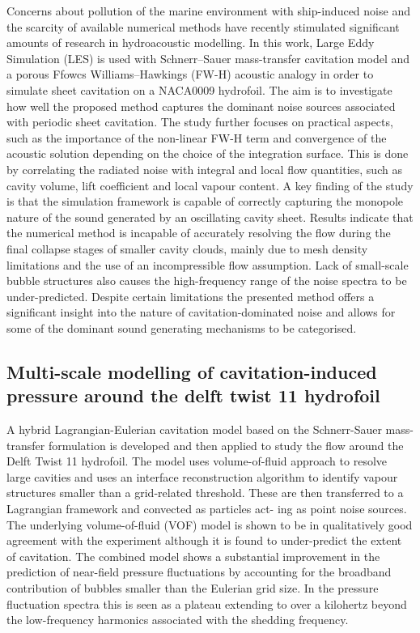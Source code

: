 \documentclass[a4paper,10pt]{article}
\begin{document}
	Concerns about pollution of the marine environment with ship-induced noise and the scarcity of available numerical methods have recently stimulated significant amounts of research in hydroacoustic modelling. In this work, Large Eddy Simulation (LES) is used with Schnerr–Sauer mass-transfer cavitation model and a porous Ffowcs Williams–Hawkings (FW-H) acoustic analogy in order to simulate sheet cavitation on a NACA0009 hydrofoil. The aim is to investigate how well the proposed method captures the dominant noise sources associated with periodic sheet cavitation. The study further focuses on practical aspects, such as the importance of the non-linear FW-H term and convergence of the acoustic solution depending on the choice of the integration surface. This is done by correlating the radiated noise with integral and local flow quantities, such as cavity volume, lift coefficient and local vapour content. A key finding of the study is that the simulation framework is capable of correctly capturing the monopole nature of the sound generated by an oscillating cavity sheet. Results indicate that the numerical method is incapable of accurately resolving the flow during the final collapse stages of smaller cavity clouds, mainly due to mesh density limitations and the use of an incompressible flow assumption. Lack of small-scale bubble structures also causes the high-frequency range of the noise spectra to be under-predicted. Despite certain limitations the presented method offers a significant insight into the nature of cavitation-dominated noise and allows for some of the dominant sound generating mechanisms to be categorised.

\subsection{Multi-scale modelling of cavitation-induced pressure around the delft twist 11 hydrofoil \cite{Lidtke2016b}}

	A hybrid Lagrangian-Eulerian cavitation model based on the Schnerr-Sauer mass-transfer formulation is developed and then applied to study the flow around the Delft Twist 11 hydrofoil. The model uses volume-of-fluid approach to resolve large cavities and uses an interface reconstruction algorithm to identify vapour structures smaller than a grid-related threshold. These are then transferred to a Lagrangian framework and convected as particles act- ing as point noise sources. The underlying volume-of-fluid (VOF) model is shown to be in qualitatively good agreement with the experiment although it is found to under-predict the extent of cavitation. The combined model shows a substantial improvement in the prediction of near-field pressure fluctuations by accounting for the broadband contribution of bubbles smaller than the Eulerian grid size. In the pressure fluctuation spectra this is seen as a plateau extending to over a kilohertz beyond the low-frequency harmonics associated with the shedding frequency.
\end{document}
